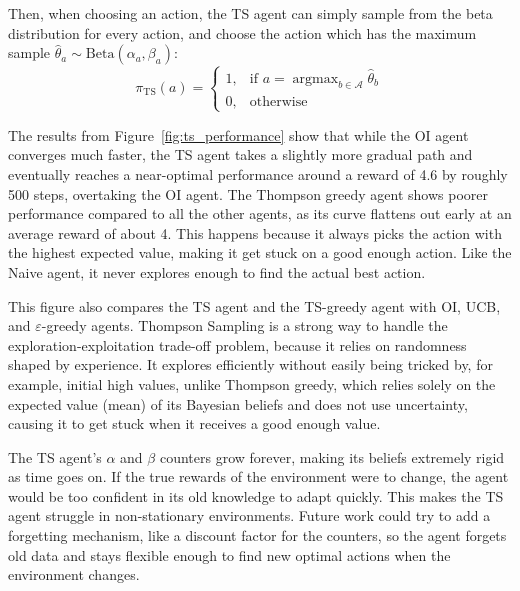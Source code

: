 \documentclass[sigconf,nonacm]{acmart}
\newcommand{\argmax}{\mathop{\mathrm{argmax}}}
\begin{document}
Then, when choosing an action, the TS agent can simply sample from the beta distribution for every action, and choose the action which has the maximum sample $\hat{\theta}_a\sim\text{Beta}(\alpha_a,\beta_a)$:
\begin{equation}
    \pi_\text{TS}(a)=\begin{cases}
        1, & \text{if } a=\argmax_{b\in\mathcal{A}}\hat{\theta}_b \\
        0, & \text{otherwise}
    \end{cases}
\end{equation}

The results from Figure~\ref{fig:ts_performance} show that while the OI agent converges much faster, the TS agent takes a slightly more gradual path and eventually reaches a near-optimal performance around a reward of 4.6 by roughly 500 steps, overtaking the OI agent. The Thompson greedy agent shows poorer performance compared to all the other agents, as its curve flattens out early at an average reward of about 4. This happens because it always picks the action with the highest expected value, making it get stuck on a good enough action. Like the Naive agent, it never explores enough to find the actual best action.

This figure also compares the TS agent and the TS-greedy agent with OI, UCB, and $\varepsilon$-greedy agents. Thompson Sampling is a strong way to handle the exploration-exploitation trade-off problem, because it relies on randomness shaped by experience. It explores efficiently without easily being tricked by, for example, initial high values, unlike Thompson greedy, which relies solely on the expected value (mean) of its Bayesian beliefs and does not use uncertainty, causing it to get stuck when it receives a good enough value.

The TS agent's $\alpha$ and $\beta$ counters grow forever, making its beliefs extremely rigid as time goes on. If the true rewards of the environment were to change, the agent would be too confident in its old knowledge to adapt quickly. This makes the TS agent struggle in non-stationary environments. Future work could try to add a forgetting mechanism, like a discount factor for the counters, so the agent forgets old data and stays flexible enough to find new optimal actions when the environment changes.




\balance


\end{document}
